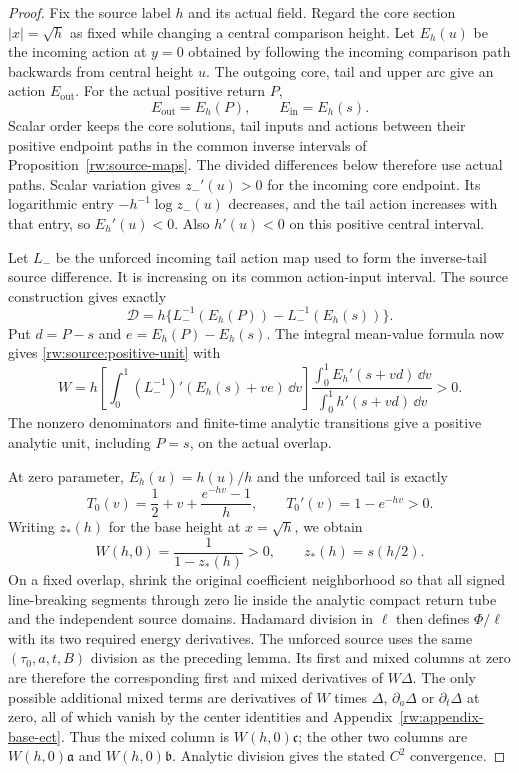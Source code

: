 \begin{proof}
Fix the source label $h$ and its actual field. Regard the core section
$|x|=\sqrt h$ as fixed while changing a central comparison height.
Let $E_h(u)$ be the incoming action at $y=0$ obtained by following
the incoming comparison path backwards from central height $u$.
The outgoing core, tail and upper arc give an action $E_{\mathrm{out}}$.
For the actual positive return $P$,
\[
 E_{\mathrm{out}}=E_h(P),\qquad E_{\mathrm{in}}=E_h(s).
\]
Scalar order keeps the core solutions, tail inputs and actions between
their positive endpoint paths in the common inverse intervals of
Proposition~\ref{rw:source-maps}. The divided differences below
therefore use actual paths.
Scalar variation gives $z_-'(u)>0$ for the incoming core endpoint.
Its logarithmic entry $-h^{-1}\log z_-(u)$ decreases, and the tail
action increases with that entry, so $E_h'(u)<0$.
Also $h'(u)<0$ on this positive central interval.

Let $L_-$ be the unforced incoming tail action map used to form the
inverse-tail source difference. It is increasing on its common
action-input interval. The source construction gives exactly
\[
 \mathcal D=h\{L_-^{-1}(E_h(P))-L_-^{-1}(E_h(s))\}.
\]
Put $d=P-s$ and $e=E_h(P)-E_h(s)$. The integral mean-value formula
now gives \eqref{rw:source:positive-unit} with
\begin{equation}\label{rw:source:unit-formula}
 W=h\left[\int_0^1(L_-^{-1})'(E_h(s)+ve)\,\dd v\right]
 \frac{\displaystyle\int_0^1E_h'(s+vd)\,\dd v}
      {\displaystyle\int_0^1h'(s+vd)\,\dd v}>0.
\end{equation}
The nonzero denominators and finite-time analytic transitions give a
positive analytic unit, including $P=s$, on the actual overlap.

At zero parameter, $E_h(u)=h(u)/h$ and the unforced tail is exactly
\[
 T_0(v)=\frac12+v+\frac{e^{-hv}-1}{h},\qquad
 T_0'(v)=1-e^{-hv}>0.
\]
Writing $z_*(h)$ for the base height at $x=\sqrt h$, we obtain
\begin{equation}\label{rw:source:base-unit}
 W(h,0)=\frac1{1-z_*(h)}>0,
 \qquad z_*(h)=s(h/2).
\end{equation}
On a fixed overlap, shrink the original coefficient neighborhood
so that all signed line-breaking segments through zero lie inside
the analytic compact return tube and the independent source domains.
Hadamard division in $\ell$ then defines $\Phi/\ell$ with its
two required energy derivatives. The unforced source uses the same
$(\tau_0,a,t,B)$ division as the preceding lemma. Its first and mixed
columns at zero are therefore the corresponding first and mixed
derivatives of $W\Delta$. The only possible additional mixed terms
are derivatives of $W$ times $\Delta$, $\partial_a\Delta$ or
$\partial_t\Delta$ at zero, all of which vanish by the center
identities and Appendix~\ref{rw:appendix-base-ect}. Thus the mixed
column is $W(h,0)\mathfrak c$; the other two columns are
$W(h,0)\mathfrak a$ and $W(h,0)\mathfrak b$.
Analytic division gives the stated $C^2$ convergence.
\end{proof}

